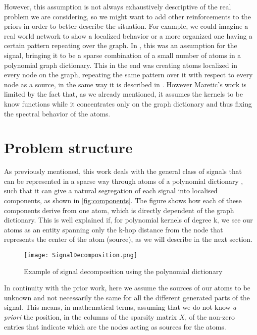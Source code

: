 However, this assumption is not always exhaustively descriptive of the real problem we are considering, so we might want to add other reinforcements to the priors in order to better describe the situation. For example, we could imagine a real world network to show a localized behavior or a more organized one having a certain pattern repeating over the graph. In \cite{Maretic2017}, this was an assumption for the signal, bringing it to be a sparse combination of a small number of atoms in a polynomial graph dictionary. This in the end was creating atoms localized in every node on the graph, repeating the same pattern over it with respect to every node as a source, in the same way it is described in \cite{Thanou2014}. However Maretic's work is limited by the fact that, as we already mentioned, it assumes the kernels to be know functions while it concentrates only on the graph dictionary and thus fixing the spectral behavior of the atoms.

\section{Problem structure}
As previously mentioned, this work deals with the general class of signals that can be represented in a sparse way through atoms of a polynomial dictionary \cite{Thanou2014}, such that it can give a natural segregation of each signal into localised components, as shown in \autoref{fig:components}. The figure shows how each of these components derive from one atom, which is directly dependent of the graph dictionary. This is well explained if, for polynomial kernels of degree k, we see our atoms as an entity spanning only the k-hop distance from the node that represents the center of the atom (source), as we will describe in the next section.

\begin{figure}
\centering
\texttt{[image: SignalDecomposition.png]}
\caption{Example of signal decomposition using the polynomial dictionary}
\label{fig:components}
\end{figure}

In continuity with the prior work, here we assume the sources of our atoms to be unknown and not necessarily the same for all the different generated parts of the signal. This means, in mathematical terms, assuming that we do not know \textit{a priori} the position, in the columns of the sparsity matrix $X$, of the non-zero entries that indicate which are the nodes acting as sources for the atoms.

